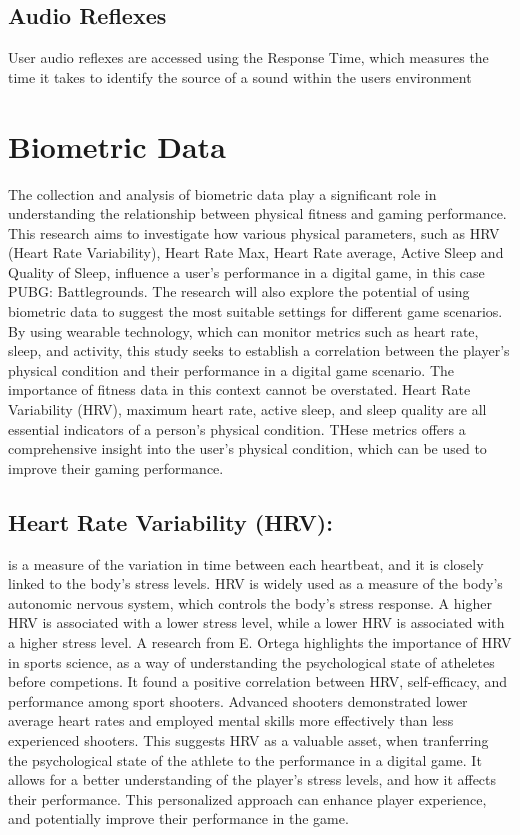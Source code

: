    \subsection{Audio Reflexes} User audio reflexes are accessed using the Response Time, which measures the time it takes to 
    identify the source of a sound within the users environment
    
    \section{Biometric Data} 
    The collection and analysis of biometric data play a significant role in understanding the relationship between physical fitness and 
    gaming performance. This research aims to investigate how various physical parameters, such as HRV (Heart Rate Variability), Heart 
    Rate Max, Heart Rate average, Active Sleep and Quality of Sleep, influence a user's performance in a digital game, in this case 
    PUBG: Battlegrounds. The  research will also explore the potential of using biometric data to suggest the most suitable settings for
    different game scenarios. By using wearable technology, which can monitor metrics such as heart rate, sleep, and activity, this study
    seeks to establish a correlation between the player's physical condition and their performance in a digital game scenario. The 
    importance of fitness data in this context cannot be overstated. Heart Rate Variability (HRV), maximum heart rate, active sleep, and 
    sleep quality are all essential indicators of a person's physical condition. THese metrics offers a comprehensive insight into the 
    user's physical condition, which can be used to improve their gaming performance. 

    \subsection{Heart Rate Variability (HRV):} is a measure of the variation in time between each heartbeat, and it is closely linked to 
    the body's stress levels. HRV is widely used as a measure of the body's autonomic nervous system, which controls the body's stress 
    response. A higher HRV is associated with a lower stress level, while a lower HRV is associated with a higher stress level. A research
    from E. Ortega\cite{ortega2018pre} highlights the importance of HRV in sports science, as a way of understanding the psychological
    state of atheletes before competions. It found a positive correlation between HRV, self-efficacy, and performance among sport shooters.
    Advanced shooters demonstrated lower average heart rates and employed mental skills more effectively than less experienced shooters.
    This suggests HRV as a valuable asset, when tranferring the psychological state of the athlete to the performance in a digital game. 
    It allows for a better understanding of the player's stress levels, and how it affects their performance. This personalized approach 
    can enhance player experience, and potentially improve their performance in the game. 
    
